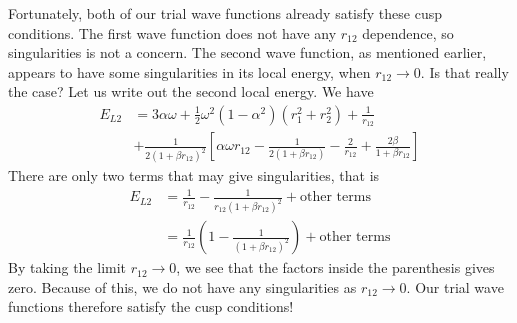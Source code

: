 \documentclass[12pt]{article}
\begin{document}
Fortunately, both of our trial wave functions already satisfy these cusp conditions. The first wave function does not have any $r_{12}$ dependence, so singularities is not a concern. The second wave function, as mentioned earlier, appears to have some singularities in its local energy, when  $r_{12} \to 0$. Is that really the case? Let us write out the second local energy. We have
\begin{align*}
E_{L2} &= 3 \alpha \omega +  \frac{1}{2}\omega^2(1-\alpha^2)(r_1^2 + r_2^2) + \frac{1}{r_{12}} \\
&+ \frac{1}{2(1+\beta r_{12})^2}\left[\alpha \omega r_{12} - \frac{1}{2(1+\beta r_{12})} - \frac{2}{r_{12}} + \frac{2\beta}{1+\beta r_{12}} \right]
\end{align*}
There are only two terms that may give singularities, that is
\begin{align*}
E_{L2} &= \frac{1}{r_{12}} - \frac{1}{r_{12}(1+\beta r_12)^2} + \text{other terms} \\
&= \frac{1}{r_{12}}\left(1 - \frac{1}{(1+\beta r_{12})^2} \right) +\text{other terms}
\end{align*}
By taking the limit $r_{12}\to 0$, we see that the factors inside the parenthesis gives zero. Because of this, we do not have any singularities as $r_{12}\to 0$. Our trial wave functions therefore satisfy the cusp conditions! 
\end{document}
